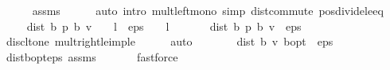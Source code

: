 \begin{isabellebody}
\ \ \ \ \isamarkupfalse%
\ assms\isanewline
\ \ \ \ \isamarkupfalse%
\ {\isacharparenleft}{\kern0pt}auto\ intro{\isacharbang}{\kern0pt}{\isacharcolon}{\kern0pt}\ mult{\isacharunderscore}{\kern0pt}left{\isacharunderscore}{\kern0pt}mono\ simp{\isacharcolon}{\kern0pt}\ dist{\isacharunderscore}{\kern0pt}commute\ pos{\isacharunderscore}{\kern0pt}divide{\isacharunderscore}{\kern0pt}le{\isacharunderscore}{\kern0pt}eq{\isacharparenright}{\kern0pt}\isanewline
\ \ \isamarkupfalse%
\ \isamarkupfalse%
\ {\isachardoublequoteopen}{}\ {\isacharasterisk}{\kern0pt}\ dist\ {\isacharparenleft}{\kern0pt}{\isasymnu}\isactrlsub b\ {\isacharquery}{\kern0pt}p{\isacharparenright}{\kern0pt}\ {\isacharparenleft}{\kern0pt}{\isasymL}\isactrlsub b\ v{\isacharparenright}{\kern0pt}\ {\isacharasterisk}{\kern0pt}\ {\isacharparenleft}{\kern0pt}{}\ {\isacharminus}{\kern0pt}\ l{\isacharparenright}{\kern0pt}\ {\isasymle}\ eps\ {\isacharasterisk}{\kern0pt}\ {\isacharparenleft}{\kern0pt}{}\ {\isacharminus}{\kern0pt}\ l{\isacharparenright}{\kern0pt}{\isachardoublequoteclose}\ \isacommand{{\isachardot}{\kern0pt}}\isamarkupfalse%
\isanewline
\ \ \isamarkupfalse%
\ {\isachardoublequoteopen}{}\ {\isacharasterisk}{\kern0pt}\ dist\ {\isacharparenleft}{\kern0pt}{\isasymnu}\isactrlsub b\ {\isacharquery}{\kern0pt}p{\isacharparenright}{\kern0pt}\ {\isacharparenleft}{\kern0pt}{\isasymL}\isactrlsub b\ v{\isacharparenright}{\kern0pt}\ {\isasymle}\ eps{\isachardoublequoteclose}\isanewline
\ \ \ \ \isamarkupfalse%
\ disc{\isacharunderscore}{\kern0pt}lt{\isacharunderscore}{\kern0pt}one\ mult{\isacharunderscore}{\kern0pt}right{\isacharunderscore}{\kern0pt}le{\isacharunderscore}{\kern0pt}imp{\isacharunderscore}{\kern0pt}le\isanewline
\ \ \ \ \isamarkupfalse%
\ auto\isanewline
\ \ \isamarkupfalse%
\ \isamarkupfalse%
\ {\isachardoublequoteopen}{}\ {\isacharasterisk}{\kern0pt}\ dist\ {\isacharparenleft}{\kern0pt}{\isasymL}\isactrlsub b\ v{\isacharparenright}{\kern0pt}\ {\isasymnu}\isactrlsub b{\isacharunderscore}{\kern0pt}opt\ {\isacharless}{\kern0pt}\ eps{\isachardoublequoteclose}\isanewline
\ \ \ \ \isamarkupfalse%
\ dist{\isacharunderscore}{\kern0pt}{\isasymL}\isactrlsub b{\isacharunderscore}{\kern0pt}opt{\isacharunderscore}{\kern0pt}eps\ assms\ \isanewline
\ \ \ \ \isamarkupfalse%
\ fastforce\isanewline
\ \ \isamarkupfalse%
\ \isamarkupfalse%

\end{isabellebody}
